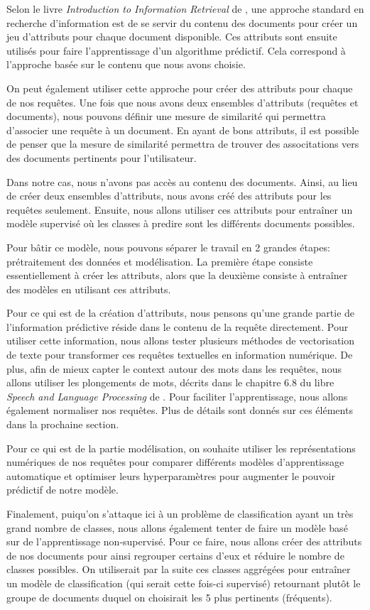
Selon le livre \emph{Introduction to Information Retrieval} de \cite{schutze2008introduction}, une approche standard en recherche d'information est de se servir du contenu des documents pour créer un jeu d'attributs pour chaque document disponible. Ces attributs sont ensuite utilisés pour faire l'apprentissage d'un algorithme prédictif. Cela correspond à l'approche basée sur le contenu que nous avons choisie.

On peut également utiliser cette approche pour créer des attributs pour chaque de nos requêtes. Une fois que nous avons deux ensembles d'attributs (requêtes et documents), nous pouvons définir une mesure de similarité qui permettra d'associer une requête à un document. En ayant de bons attributs, il est possible de penser que la mesure de similarité permettra de trouver des associtations vers des documents pertinents pour l'utilisateur.

Dans notre cas, nous n'avons pas accès au contenu des documents. Ainsi, au lieu de créer deux ensembles d'attributs, nous avons créé des attributs pour les requêtes seulement. Ensuite, nous allons utiliser ces attributs pour entraîner un modèle supervisé où les classes à predire sont les différents documents possibles.
\break

Pour bâtir ce modèle, nous pouvons séparer le travail en 2 grandes étapes: prétraitement des données et modélisation. La première étape consiste essentiellement à créer les attributs, alors que la deuxième consiste à entraîner des modèles en utilisant ces attributs.

Pour ce qui est de la création d'attributs, nous pensons qu'une grande partie de l'information prédictive réside dans le contenu de la requête directement. Pour utiliser cette information, nous allons tester plusieurs méthodes de vectorisation de texte pour transformer ces requêtes textuelles en information numérique. De plus, afin de mieux capter le context autour des mots dans les requêtes, nous allons utiliser les plongements de mots, décrits dans le chapitre 6.8 du libre \emph{Speech and Language Processing} de \cite{jurafsky2014speech}. Pour faciliter l'apprentissage, nous allons également normaliser nos requêtes. Plus de détails sont donnés sur ces éléments dans la prochaine section.

Pour ce qui est de la partie modélisation, on souhaite utiliser les représentations numériques de nos requêtes pour comparer différents modèles d'apprentissage automatique et optimiser leurs hyperparamètres pour augmenter le pouvoir prédictif de notre modèle.
\break

Finalement, puiqu'on s'attaque ici à un problème de classification ayant un très grand nombre de classes, nous allons également tenter de faire un modèle basé sur de l'apprentissage non-supervisé. Pour ce faire, nous allons créer des attributs de nos documents pour ainsi regrouper certains d'eux et réduire le nombre de classes possibles. On utiliserait par la suite ces classes aggrégées pour entraîner un modèle de classification (qui serait cette fois-ci supervisé) retournant plutôt le groupe de documents duquel on choisirait les 5 plus pertinents (fréquents).

